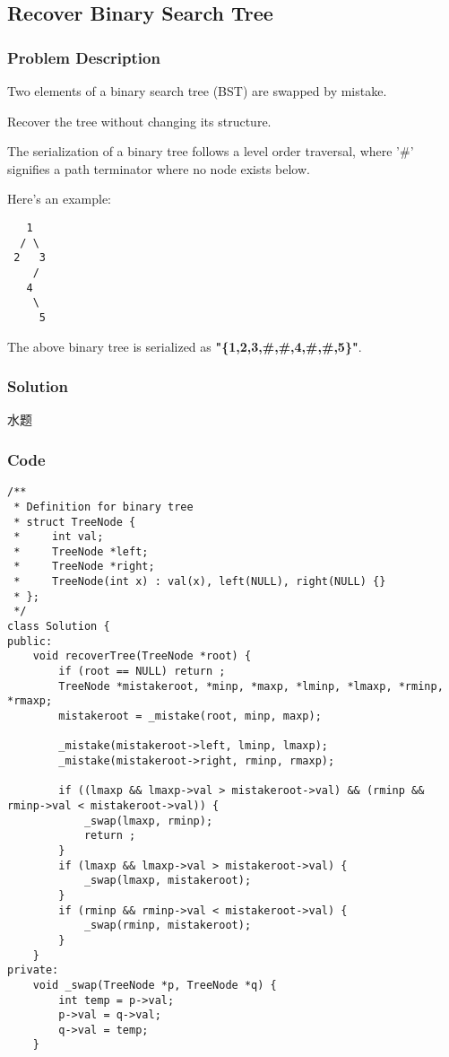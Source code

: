 \documentclass[courier]{article}
\begin{document}
\begin{CJK*}{UTF8}{gkai}
\subsection{ Recover Binary Search Tree }

\subsubsection*{Problem Description}
Two elements of a binary search tree (BST) are swapped by mistake.

Recover the tree without changing its structure.

The serialization of a binary tree follows a level order traversal, where '\#' signifies a path terminator where no node exists below.

Here's an example:


\begin{verbatim}
   1
  / \
 2   3
    /
   4
    \
     5
\end{verbatim}
The above binary tree is serialized as \textbf{"\{1,2,3,\#,\#,4,\#,\#,5\}"}.



\subsubsection*{Solution}
水题

\subsubsection*{Code}
\begin{lstlisting}
/**
 * Definition for binary tree
 * struct TreeNode {
 *     int val;
 *     TreeNode *left;
 *     TreeNode *right;
 *     TreeNode(int x) : val(x), left(NULL), right(NULL) {}
 * };
 */
class Solution {
public:
    void recoverTree(TreeNode *root) {
        if (root == NULL) return ;
        TreeNode *mistakeroot, *minp, *maxp, *lminp, *lmaxp, *rminp, *rmaxp;
        mistakeroot = _mistake(root, minp, maxp);
        
        _mistake(mistakeroot->left, lminp, lmaxp);
        _mistake(mistakeroot->right, rminp, rmaxp);
        
        if ((lmaxp && lmaxp->val > mistakeroot->val) && (rminp && rminp->val < mistakeroot->val)) {
            _swap(lmaxp, rminp);
            return ;
        }
        if (lmaxp && lmaxp->val > mistakeroot->val) {
            _swap(lmaxp, mistakeroot);
        }
        if (rminp && rminp->val < mistakeroot->val) {
            _swap(rminp, mistakeroot);
        }
    }
private:
    void _swap(TreeNode *p, TreeNode *q) {
        int temp = p->val;
        p->val = q->val;
        q->val = temp;
    }
    

\end{lstlisting}
\end{CJK*}
\end{document}
